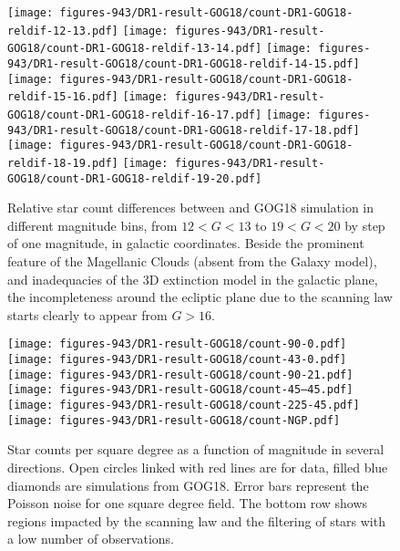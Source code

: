 \begin{figure*}
\begin{center}
\texttt{[image: figures-943/DR1-result-GOG18/count-DR1-GOG18-reldif-12-13.pdf]}
\texttt{[image: figures-943/DR1-result-GOG18/count-DR1-GOG18-reldif-13-14.pdf]}
\texttt{[image: figures-943/DR1-result-GOG18/count-DR1-GOG18-reldif-14-15.pdf]}
\texttt{[image: figures-943/DR1-result-GOG18/count-DR1-GOG18-reldif-15-16.pdf]}
\texttt{[image: figures-943/DR1-result-GOG18/count-DR1-GOG18-reldif-16-17.pdf]}
\texttt{[image: figures-943/DR1-result-GOG18/count-DR1-GOG18-reldif-17-18.pdf]}
\texttt{[image: figures-943/DR1-result-GOG18/count-DR1-GOG18-reldif-18-19.pdf]}
\texttt{[image: figures-943/DR1-result-GOG18/count-DR1-GOG18-reldif-19-20.pdf]}
\caption{Relative star count differences between {} and GOG18 simulation in different magnitude bins, 
from $12<G<13$ to $19<G<20$ by step of one magnitude, in galactic coordinates. 
Beside the prominent feature of the Magellanic Clouds (absent from the Galaxy model), 
and inadequacies of the 3D extinction model in the galactic plane, 
the {\gaia} incompleteness around the ecliptic plane due to the scanning law starts 
clearly to appear from $G>16$.}
\label{fig:skymap}
\end{center}
\end{figure*}

\begin{figure*}
\begin{center}
\texttt{[image: figures-943/DR1-result-GOG18/count-90-0.pdf]}
\texttt{[image: figures-943/DR1-result-GOG18/count-43-0.pdf]}%
\texttt{[image: figures-943/DR1-result-GOG18/count-90-21.pdf]}
\texttt{[image: figures-943/DR1-result-GOG18/count-45--45.pdf]}
\texttt{[image: figures-943/DR1-result-GOG18/count-225-45.pdf]}
\texttt{[image: figures-943/DR1-result-GOG18/count-NGP.pdf]}
\caption{Star counts per square degree as a function of magnitude in several directions. Open circles linked with red lines are for {} data, filled blue diamonds are simulations from GOG18. Error bars represent the Poisson noise for one square degree field. The bottom row shows regions impacted by the scanning law and the filtering of stars with a low number of observations.}
\label{fig:histograms}
\end{center}
\end{figure*}


